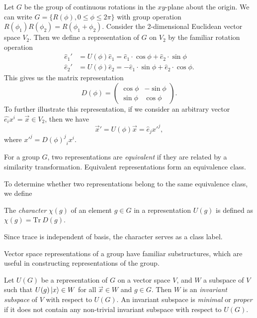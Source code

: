 \begin{example}
    Let $G$ be the group of continuous rotations in the $xy$-plane about the origin. We can write $G = \{R(\phi),0\leq\phi\leq2\pi\}$ with group operation $R(\phi_1)R(\phi_2) = R(\phi_1+\phi_2)$. Consider the 2-dimensional Euclidean vector space $V_2$. Then we define a representation of $G$ on $V_2$ by the familiar rotation operation
    \begin{align}
        \hat{e}_1' &= U(\phi)\hat{e}_1 = \hat{e}_1\cdot\cos\phi + \hat{e}_2\cdot\sin\phi\\
        \hat{e}_2' &= U(\phi)\hat{e}_2 = -\hat{e}_1\cdot\sin\phi + \hat{e}_2\cdot\cos\phi.
    \end{align}
This gives us the matrix representation
\begin{equation}
    D(\phi) = \begin{pmatrix}
        \cos\phi & -\sin\phi\\
        \sin\phi & \cos\phi
    \end{pmatrix}.
\end{equation}
To further illustrate this representation, if we consider an arbitrary vector $\hat{e_i}x^i=\vec{x}\in V_2$, then we have
\begin{equation}
    \vec{x}' = U(\phi)\vec{x} = \hat{e}_j{x'}^j,
\end{equation}
where ${x'}^j = {{D(\phi)}^j}_i x^i$.
\end{example}

\begin{definition}
    For a group $G$, two representations are \textit{equivalent} if they are related by a similarity transformation. Equivalent representations form an equivalence class.
\end{definition}

To determine whether two representations belong to the same equivalence class, we define
\begin{definition}
    The \textit{character} $\chi(g)$ of an element $g\in G$ in a representation $U(g)$ is defined as $\chi(g) = \text{Tr}~D(g)$.
\end{definition}
Since trace is independent of basis, the character serves as a class label.

Vector space representations of a group have familiar substructures, which are useful in constructing representations of the group.
\begin{definition}
    Let $U(G)$ be a representation of $G$ on a vector space $V$, and $W$ a subspace of $V$ such that $U(g)\ket{x}\in W$ for all $\vec{x}\in W$ and $g\in G$. Then $W$ is an \textit{invariant subspace} of $V$ with respect to $U(G)$. An invariant subspace is \textit{minimal} or \textit{proper} if it does not contain any non-trivial invariant subspace with respect to $U(G)$.
\end{definition}

